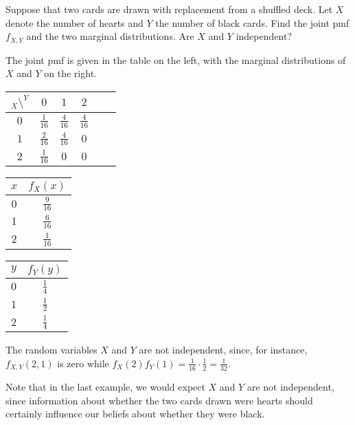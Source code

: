 \begin{examp}Suppose that two cards are drawn with replacement from a shuffled deck. Let $X$ denote the number of hearts and $Y$ the number of black cards. Find the joint pmf $f_{X,Y}$ and the two marginal distributions. Are $X$ and $Y$ independent?
\par
\noindent The joint pmf is given in the table on the left, with the marginal distributions of $X$ and $Y$ on the right. 

\begin{center}
\begin{minipage}{0.4\textwidth}
\renewcommand{\arraystretch}{1.5}
\centering
\begin{tabular}{c|ccccc}
$_{X} \setminus ^Y$ & $0$ & $1$ & $2$ \\
\hline
$0$ & $\frac{1}{16}$ & $\frac{4}{16}$ & $\frac{4}{16}$ \\
$1$ & $\frac{2}{16}$ & $\frac{4}{16}$ & $0$ \\
$2$ & $\frac{1}{16}$ & $0$ & $0$  \\
\end{tabular}
\end{minipage}\begin{minipage}{0.25\textwidth}
\centering
\renewcommand{\arraystretch}{1.5}
\begin{tabular}{c|c}
$x$ & $f_X(x)$ \\
\hline
$0$ & $\frac{9}{16}$ \\
$1$ & $\frac{6}{16}$ \\
$2$ & $\frac{1}{16}$ \\
\end{tabular}
\end{minipage}\begin{minipage}{0.25\textwidth}
\centering
\renewcommand{\arraystretch}{1.5}
\begin{tabular}{c|c}
$y$ & $f_Y(y)$ \\
\hline
$0$ & $\frac{1}{4}$ \\
$1$ & $\frac{1}{2}$ \\
$2$ & $\frac{1}{4}$ \\
\end{tabular}
\end{minipage}
\end{center}
The random variables $X$ and $Y$ are not independent, since, for instance, $f_{X,Y}(2,1)$ is zero while $f_X(2)f_Y(1) = \frac{1}{16}\cdot\frac{1}{2} = \frac{1}{32}$.
\end{examp}
\par
Note that in the last example, we would expect $X$ and $Y$ are not independent, since information about whether the two cards drawn were hearts should certainly influence our beliefs about whether they were black.
